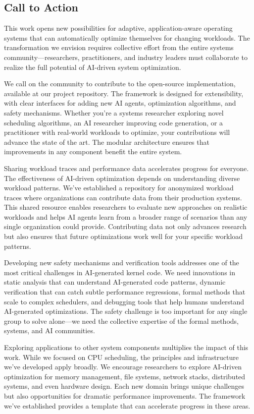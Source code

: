 \subsection{Call to Action}

This work opens new possibilities for adaptive, application-aware operating systems that can automatically optimize themselves for changing workloads. The transformation we envision requires collective effort from the entire systems community—researchers, practitioners, and industry leaders must collaborate to realize the full potential of AI-driven system optimization.

We call on the community to contribute to the open-source implementation, available at our project repository. The framework is designed for extensibility, with clear interfaces for adding new AI agents, optimization algorithms, and safety mechanisms. Whether you're a systems researcher exploring novel scheduling algorithms, an AI researcher improving code generation, or a practitioner with real-world workloads to optimize, your contributions will advance the state of the art. The modular architecture ensures that improvements in any component benefit the entire system.

Sharing workload traces and performance data accelerates progress for everyone. The effectiveness of AI-driven optimization depends on understanding diverse workload patterns. We've established a repository for anonymized workload traces where organizations can contribute data from their production systems. This shared resource enables researchers to evaluate new approaches on realistic workloads and helps AI agents learn from a broader range of scenarios than any single organization could provide. Contributing data not only advances research but also ensures that future optimizations work well for your specific workload patterns.

Developing new safety mechanisms and verification tools addresses one of the most critical challenges in AI-generated kernel code. We need innovations in static analysis that can understand AI-generated code patterns, dynamic verification that can catch subtle performance regressions, formal methods that scale to complex schedulers, and debugging tools that help humans understand AI-generated optimizations. The safety challenge is too important for any single group to solve alone—we need the collective expertise of the formal methods, systems, and AI communities.

Exploring applications to other system components multiplies the impact of this work. While we focused on CPU scheduling, the principles and infrastructure we've developed apply broadly. We encourage researchers to explore AI-driven optimization for memory management, file systems, network stacks, distributed systems, and even hardware design. Each new domain brings unique challenges but also opportunities for dramatic performance improvements. The framework we've established provides a template that can accelerate progress in these areas.

